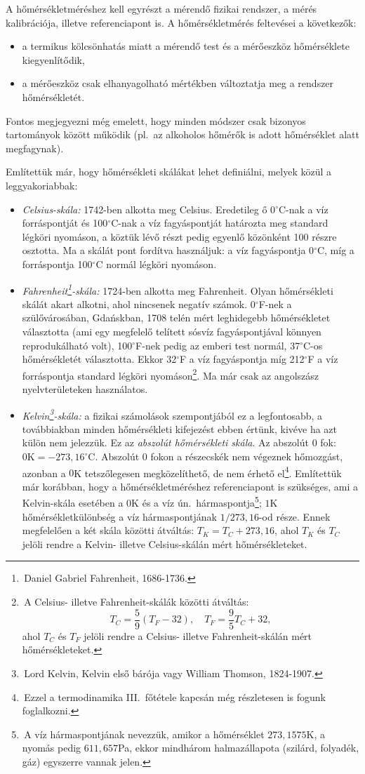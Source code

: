 A hőmérsékletméréshez kell egyrészt a mérendő fizikai rendszer, a mérés kalibrációja, illetve referenciapont is. A hőmérsékletmérés feltevései a következők:
\begin{itemize}
    \item a termikus kölcsönhatás miatt a mérendő test és a mérőeszköz hőmérséklete kiegyenlítődik,
    \item a mérőeszköz csak elhanyagolható mértékben változtatja meg a rendszer hőmérsékletét.
\end{itemize}
Fontos megjegyezni még emelett, hogy minden módszer csak bizonyos tartományok között működik (pl.~az alkoholos hőmérők is adott hőmérséklet alatt megfagynak).

Említettük már, hogy hőmérsékleti skálákat lehet definiálni, melyek közül a leggyakoriabbak:
\begin{itemize}
    \item \emph{Celsius-skála:} 1742-ben alkotta meg Celsius. Eredetileg ő 0$^\circ$C-nak a víz forráspontját és 100$^\circ$C-nak a víz fagyáspontját határozta meg standard légköri nyomáson, a köztük lévő részt pedig egyenlő közönként 100 részre osztotta. Ma a skálát pont fordítva használjuk: a víz fagyáspontja 0$^\circ$C, míg a forráspontja 100$^\circ$C normál légköri nyomáson.
    \item \emph{Fahrenheit\footnote{\,Daniel Gabriel Fahrenheit, 1686-1736.}-skála:} 1724-ben alkotta meg Fahrenheit. Olyan hőmérsékleti skálát akart alkotni, ahol nincsenek negatív számok. 0$^\circ$F-nek a szülővárosában, Gda\'nskban, 1708 telén mért leghidegebb hőmérsékletet választotta (ami egy megfelelő telített sósvíz fagyáspontjával könnyen reprodukálható volt), 100$^\circ$F-nek pedig az emberi test normál, 37$^\circ$C-os hőmérsékletét választotta. Ekkor 32$^\circ$F a víz fagyáspontja míg 212$^\circ$F a víz forráspontja standard légköri nyomáson\footnote{\,A Celsius- illetve Fahrenheit-skálák közötti átváltás: $$T_C = \frac 59(T_F -32),\quad  T_F = \frac 95 T_C+32,$$ ahol $T_C$ és $T_F$ jelöli rendre a Celsius- illetve Fahrenheit-skálán mért hőmérsékleteket.}. Ma már csak az angolszász nyelvterületeken használatos.
    \item \emph{Kelvin\footnote{\,Lord Kelvin, Kelvin első bárója vagy William Thomson, 1824-1907.}-skála:} a fizikai számolások szempontjából ez a legfontosabb, a továbbiakban minden hőmérsékleti kifejezést ebben értünk, kivéve ha azt külön nem jelezzük. Ez az \emph{abszolút hőmérsékleti skála}. Az abszolút 0 fok: $0 \mathrm K = -273{,}16^\circ$C. Abszolút 0 fokon a részecskék nem végeznek hőmozgást, azonban a $0$K tetszőlegesen megközelíthető, de nem érhető el\footnote{\,Ezzel a termodinamika III.~főtétele kapcsán még részletesen is fogunk foglalkozni.}. Említettük már korábban, hogy a hőmérsékletméréshez referenciapont is szükséges, ami a Kelvin-skála esetében a $0$K és a víz ún.~hármaspontja\footnote{\,A víz hármaspontjának nevezzük, amikor a hőmérséklet $273{,}1575$K, a nyomás pedig $611{,}657$Pa, ekkor mindhárom halmazállapota (szilárd, folyadék, gáz) egyszerre vannak jelen.}; $1$K hőmérsékletkülönbség a víz hármaspontjának $1/273{,}16$-od része. Ennek megfelelően a két skála közötti átváltás: $T_K = T_C + 273{,}16$, ahol $T_K$ és $T_C$ jelöli rendre a Kelvin- illetve Celsius-skálán mért hőmérsékleteket.

\end{itemize}
